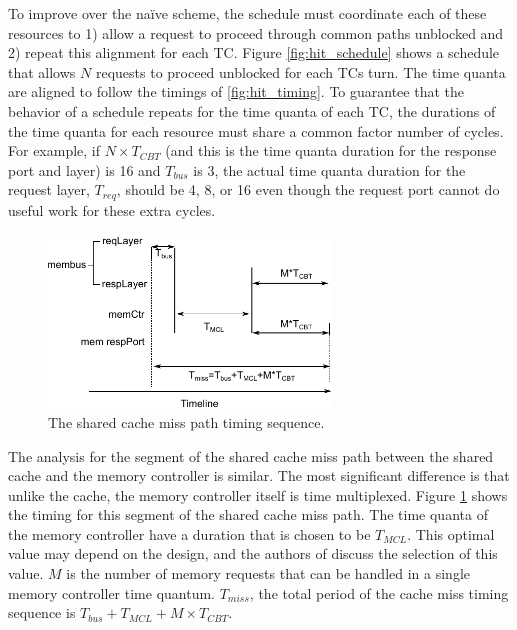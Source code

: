 To improve over the naïve scheme, the schedule must coordinate each of these 
resources to 1) allow a request to proceed through common paths unblocked and 
2) repeat this alignment for each TC. Figure \ref{fig:hit_schedule} shows a 
schedule that allows $N$ requests to proceed unblocked for each TCs turn. The 
time quanta are aligned to follow the timings of \ref{fig:hit_timing}. To 
guarantee that the behavior of a schedule repeats for the time quanta of each 
TC, the durations of the time quanta for each resource must share a common 
factor number of cycles. For example, if $N \times T_{CBT}$ (and this is the 
time quanta duration for the response port and layer) is 16 and $T_{bus}$ is 3, 
the actual time quanta duration for the request layer, $T_{req}$, should be 4, 
8, or 16 even though the request port cannot do useful work for these extra 
cycles. 

\begin{figure}
    \begin{center}
        \includegraphics[width=2.9475in]{figs/miss_timing.pdf}
        \caption{The shared cache miss path timing sequence.}
        \label{fig:miss_timing}
    \end{center}
\end{figure}

The analysis for the segment of the shared cache miss path between the shared 
cache and the memory controller is similar. The most significant difference is 
that unlike the cache, the memory controller itself is time multiplexed. Figure 
\ref{fig:miss_timing} shows the timing for this segment of the shared cache 
miss path. The time quanta of the memory controller have a duration that is 
chosen to be $T_{MCL}$. This optimal value may depend on the design, and
the authors of \cite{ushpca14} discuss the selection of this value. $M$ is the 
number of memory requests that can be handled in a single memory controller 
time quantum.
$T_{miss}$, the total period of the cache miss timing sequence is 
$T_{bus}+T_{MCL}+M\times T_{CBT}$.

